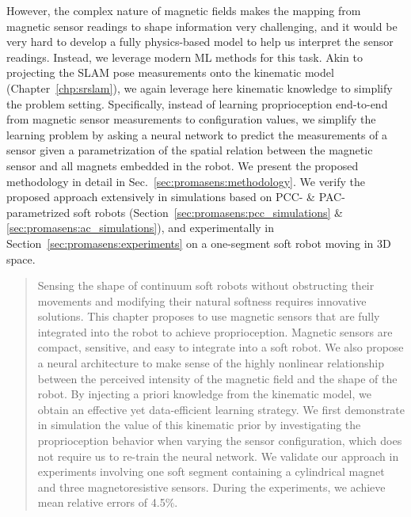 \begin{foreword}
    However, the complex nature of magnetic fields makes the mapping from magnetic sensor readings to shape information very challenging, and it would be very hard to develop a fully physics-based model to help us interpret the sensor readings. Instead, we leverage modern \gls{ML} methods for this task.
    Akin to projecting the \gls{SLAM} pose measurements onto the kinematic model (Chapter~\ref{chp:srslam}), we again leverage here kinematic knowledge to simplify the problem setting. 
    Specifically, instead of learning proprioception end-to-end from magnetic sensor measurements to configuration values, we simplify the learning problem by asking a neural network to predict the measurements of a sensor given a parametrization of the spatial relation between the magnetic sensor and all magnets embedded in the robot. We present the proposed methodology in detail in Sec.~\ref{sec:promasens:methodology}.
    We verify the proposed approach extensively in simulations based on \gls{PCC}- \& \gls{PAC}-parametrized soft robots (Section~\ref{sec:promasens:pcc_simulations} \& \ref{sec:promasens:ac_simulations}), and experimentally in Section~\ref{sec:promasens:experiments} on a one-segment soft robot moving in 3D space.
\end{foreword}



\pagebreak

\begin{abstract}
    Sensing the shape of continuum soft robots without obstructing their movements and modifying their natural softness requires innovative solutions. This chapter proposes to use magnetic sensors that are fully integrated into the robot to achieve proprioception. Magnetic sensors are compact, sensitive, and easy to integrate into a soft robot. We also propose a neural architecture to make sense of the highly nonlinear relationship between the perceived intensity of the magnetic field and the shape of the robot. By injecting a priori knowledge from the kinematic model, we obtain an effective yet data-efficient learning strategy. We first demonstrate in simulation the value of this kinematic prior by investigating the proprioception behavior when varying the sensor configuration, which does not require us to re-train the neural network. We validate our approach in experiments involving one soft segment containing a cylindrical magnet and three magnetoresistive sensors. During the experiments, we achieve mean relative errors of 4.5\%.
\end{abstract}

